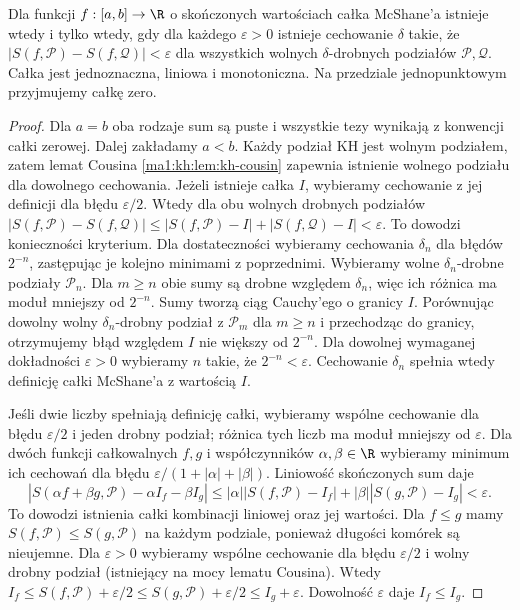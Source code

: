 \begin{twierdzenie}\label{it:thm:mcshane-basic}
Dla funkcji $f:[a,b]\to\R$ o skończonych wartościach
całka McShane'a istnieje wtedy i tylko wtedy, gdy dla każdego
$\varepsilon>0$ istnieje cechowanie $\delta$ takie, że
$|S(f,\mathcal P)-S(f,\mathcal Q)|<\varepsilon$ dla wszystkich
wolnych $\delta$-drobnych podziałów $\mathcal P,\mathcal Q$.
Całka jest jednoznaczna, liniowa i monotoniczna.
Na przedziale jednopunktowym przyjmujemy całkę zero.
\end{twierdzenie}
\begin{proof}
Dla $a=b$ oba rodzaje sum są puste i wszystkie tezy wynikają z konwencji całki zerowej. Dalej zakładamy $a<b$. Każdy podział KH jest wolnym podziałem, zatem lemat Cousina
\ref{ma1:kh:lem:kh-cousin} zapewnia istnienie wolnego podziału
dla dowolnego cechowania. Jeżeli istnieje całka $I$, wybieramy cechowanie
z jej definicji dla błędu $\varepsilon/2$.
Wtedy dla obu wolnych drobnych podziałów
$|S(f,\mathcal P)-S(f,\mathcal Q)|
\le |S(f,\mathcal P)-I|+|S(f,\mathcal Q)-I|
<\varepsilon$. To dowodzi konieczności kryterium. Dla dostateczności wybieramy cechowania
$\delta_n$ dla błędów $2^{-n}$, zastępując je kolejno
minimami z poprzednimi. Wybieramy wolne $\delta_n$-drobne
podziały $\mathcal P_n$. Dla $m\ge n$ obie sumy są drobne
względem $\delta_n$, więc ich różnica ma moduł mniejszy
od $2^{-n}$. Sumy tworzą ciąg Cauchy'ego o granicy $I$.
Porównując dowolny wolny $\delta_n$-drobny podział
z $\mathcal P_m$ dla $m\ge n$ i przechodząc do granicy,
otrzymujemy błąd względem $I$ nie większy od $2^{-n}$. Dla dowolnej wymaganej dokładności $\varepsilon>0$ wybieramy $n$ takie, że $2^{-n}<\varepsilon$. Cechowanie $\delta_n$ spełnia wtedy definicję całki McShane'a z wartością $I$.

Jeśli dwie liczby spełniają definicję całki, wybieramy
wspólne cechowanie dla błędu $\varepsilon/2$ i jeden drobny
podział; różnica tych liczb ma moduł mniejszy od $\varepsilon$.
Dla dwóch funkcji całkowalnych $f,g$ i współczynników $\alpha,\beta\in\R$ wybieramy minimum ich cechowań dla błędu $\varepsilon/(1+|\alpha|+|\beta|)$. Liniowość skończonych sum daje
\[
 |S(\alpha f+\beta g,\mathcal P)-\alpha I_f-\beta I_g|
 \le |\alpha||S(f,\mathcal P)-I_f|
     +|\beta||S(g,\mathcal P)-I_g|<\varepsilon.
\]
To dowodzi istnienia całki kombinacji liniowej oraz jej wartości.
Dla $f\le g$ mamy $S(f,\mathcal P)\le S(g,\mathcal P)$
na każdym podziale, ponieważ długości komórek są nieujemne.
Dla $\varepsilon>0$ wybieramy wspólne cechowanie dla błędu $\varepsilon/2$ i wolny drobny podział (istniejący na mocy lematu Cousina). Wtedy $I_f\le S(f,\mathcal P)+\varepsilon/2\le S(g,\mathcal P)+\varepsilon/2\le I_g+\varepsilon$. Dowolność $\varepsilon$ daje $I_f\le I_g$.
\end{proof}

